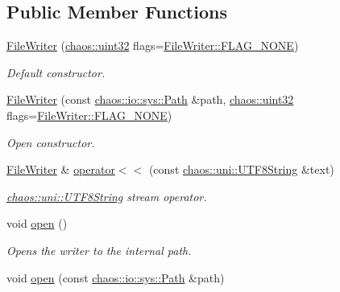 \subsection*{Public Member Functions}
\begin{DoxyCompactItemize}
\item 
\hyperlink{classchaos_1_1io_1_1sys_1_1_file_writer_a84eee0f6699f145dd314201bbb60cab5}{File\+Writer} (\hyperlink{namespacechaos_a8641b3ae4551f0b35570d4f9f4ec22d9}{chaos\+::uint32} flags=\hyperlink{classchaos_1_1io_1_1sys_1_1_file_writer_aafcaef6dd3171373d8dfadadcc3c1b0bab1c0f867f11da4ed8678148548fa9458}{File\+Writer\+::\+F\+L\+A\+G\+\_\+\+N\+O\+N\+E})
\begin{DoxyCompactList}\small\item\em Default constructor. \end{DoxyCompactList}\item 
\hyperlink{classchaos_1_1io_1_1sys_1_1_file_writer_ade3f783fcaa44caf8ae1b3011e9847a1}{File\+Writer} (const \hyperlink{classchaos_1_1io_1_1sys_1_1_path}{chaos\+::io\+::sys\+::\+Path} \&path, \hyperlink{namespacechaos_a8641b3ae4551f0b35570d4f9f4ec22d9}{chaos\+::uint32} flags=\hyperlink{classchaos_1_1io_1_1sys_1_1_file_writer_aafcaef6dd3171373d8dfadadcc3c1b0bab1c0f867f11da4ed8678148548fa9458}{File\+Writer\+::\+F\+L\+A\+G\+\_\+\+N\+O\+N\+E})
\begin{DoxyCompactList}\small\item\em Open constructor. \end{DoxyCompactList}\item 
\hyperlink{classchaos_1_1io_1_1sys_1_1_file_writer}{File\+Writer} \& \hyperlink{classchaos_1_1io_1_1sys_1_1_file_writer_a4b94a57e0cde394a9a3ade4a5022dc43}{operator$<$$<$} (const \hyperlink{classchaos_1_1uni_1_1_u_t_f8_string}{chaos\+::uni\+::\+U\+T\+F8\+String} \&text)
\begin{DoxyCompactList}\small\item\em \hyperlink{classchaos_1_1uni_1_1_u_t_f8_string}{chaos\+::uni\+::\+U\+T\+F8\+String} stream operator. \end{DoxyCompactList}\item 
void \hyperlink{classchaos_1_1io_1_1sys_1_1_file_writer_a2ed0e1f9c6cdf4120e6c9b61cf14738a}{open} ()
\begin{DoxyCompactList}\small\item\em Opens the writer to the internal path. \end{DoxyCompactList}\item 
void \hyperlink{classchaos_1_1io_1_1sys_1_1_file_writer_ae979d1d88397de34ede7b023e5d4306a}{open} (const \hyperlink{classchaos_1_1io_1_1sys_1_1_path}{chaos\+::io\+::sys\+::\+Path} \&path)

\end{DoxyCompactItemize}
